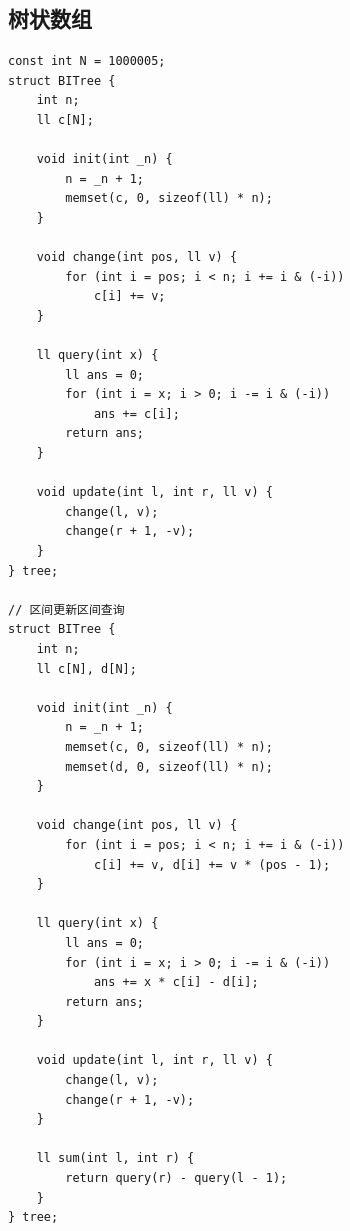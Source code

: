 \documentclass[twoside]{article}
\begin{document}
\subsection{树状数组}
\begin{lstlisting}
const int N = 1000005;
struct BITree {
    int n;
    ll c[N];

    void init(int _n) {
        n = _n + 1;
        memset(c, 0, sizeof(ll) * n);
    }

    void change(int pos, ll v) {
        for (int i = pos; i < n; i += i & (-i))
            c[i] += v;
    }

    ll query(int x) {
        ll ans = 0;
        for (int i = x; i > 0; i -= i & (-i))
            ans += c[i];
        return ans;
    }

    void update(int l, int r, ll v) {
        change(l, v);
        change(r + 1, -v);
    }
} tree;

// 区间更新区间查询
struct BITree {
    int n;
    ll c[N], d[N];

    void init(int _n) {
        n = _n + 1;
        memset(c, 0, sizeof(ll) * n);
        memset(d, 0, sizeof(ll) * n);
    }

    void change(int pos, ll v) {
        for (int i = pos; i < n; i += i & (-i))
            c[i] += v, d[i] += v * (pos - 1);
    }

    ll query(int x) {
        ll ans = 0;
        for (int i = x; i > 0; i -= i & (-i))
            ans += x * c[i] - d[i];
        return ans;
    }

    void update(int l, int r, ll v) {
        change(l, v);
        change(r + 1, -v);
    }

    ll sum(int l, int r) {
        return query(r) - query(l - 1);
    }
} tree;\end{lstlisting}
\end{document}
